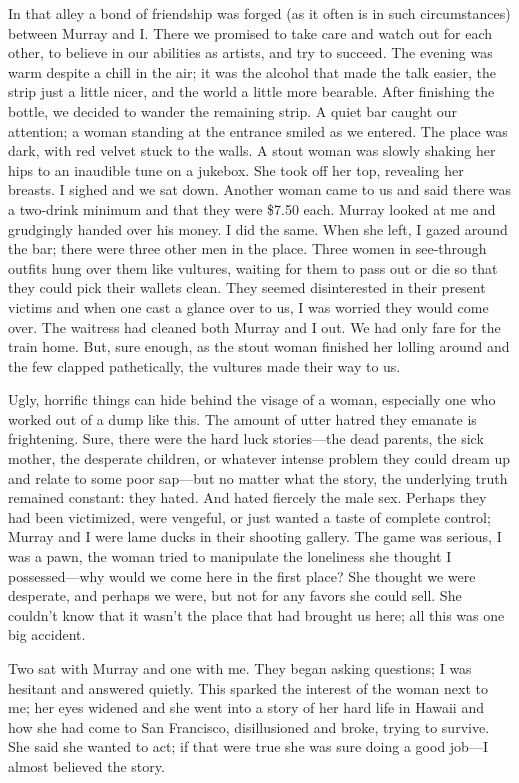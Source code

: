 In that alley a bond of friendship was forged (as it often is in such
circumstances) between Murray and I. There we promised to take care and
watch out for each other, to believe in our abilities as artists, and
try to succeed. The evening was warm despite a chill in the air; it was
the alcohol that made the talk easier, the strip just a little nicer,
and the world a little more bearable. After finishing the bottle, we
decided to wander the remaining strip. A quiet bar caught our attention;
a woman standing at the entrance smiled as we entered. The place was
dark, with red velvet stuck to the walls. A stout woman was slowly
shaking her hips to an inaudible tune on a jukebox. She took off her
top, revealing her breasts. I sighed and we sat down. Another woman came
to us and said there was a two-drink minimum and that they were \$7.50
each. Murray looked at me and grudgingly handed over his money. I did
the same. When she left, I gazed around the bar; there were three other
men in the place. Three women in see-through outfits hung over them like
vultures, waiting for them to pass out or die so that they could pick
their wallets clean. They seemed disinterested in their present victims
and when one cast a glance over to us, I was worried they would come
over. The waitress had cleaned both Murray and I out. We had only fare
for the train home. But, sure enough, as the stout woman finished her
lolling around and the few clapped pathetically, the vultures made their
way to us.

Ugly, horrific things can hide behind the visage of a woman, especially
one who worked out of a dump like this. The amount of utter hatred they
emanate is frightening. Sure, there were the hard luck stories---the
dead parents, the sick mother, the desperate children, or whatever
intense problem they could dream up and relate to some poor sap---but no
matter what the story, the underlying truth remained constant: they
hated. And hated fiercely the male sex. Perhaps they had been
victimized, were vengeful, or just wanted a taste of complete control;
Murray and I were lame ducks in their shooting gallery. The game was
serious, I was a pawn, the woman tried to manipulate the loneliness she
thought I possessed---why would we come here in the first place? She
thought we were desperate, and perhaps we were, but not for any favors
she could sell. She couldn't know that it wasn't the place that had
brought us here; all this was one big accident.

Two sat with Murray and one with me. They began asking questions; I was
hesitant and answered quietly. This sparked the interest of the woman
next to me; her eyes widened and she went into a story of her hard life
in Hawaii and how she had come to San Francisco, disillusioned and
broke, trying to survive. She said she wanted to act; if that were true
she was sure doing a good job---I almost believed the story.


